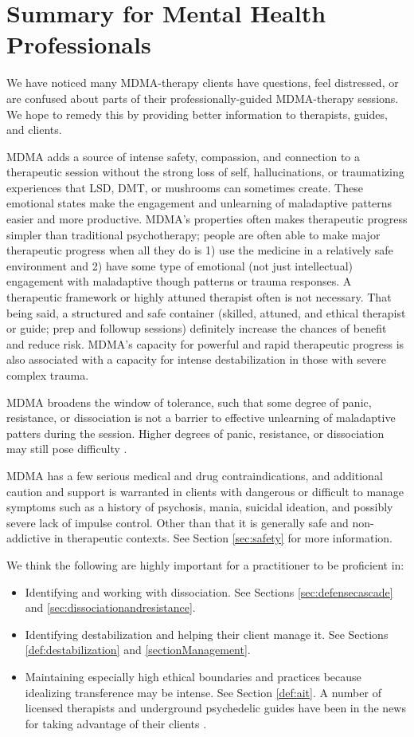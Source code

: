 \documentclass[12pt,letterpaper]{book}
\begin{document}
\section{Summary for Mental Health Professionals}
We have noticed many MDMA-therapy clients have questions, feel distressed, or are confused about parts of their professionally-guided MDMA-therapy sessions. We hope to remedy this by providing better information to therapists, guides, and clients.

MDMA adds a source of intense safety, compassion, and connection to a therapeutic session without the strong loss of self, hallucinations, or traumatizing experiences that LSD, DMT, or mushrooms can sometimes create. These emotional states make the engagement and unlearning of maladaptive patterns easier and more productive. MDMA's properties often makes therapeutic progress simpler than traditional psychotherapy; people are often able to make major therapeutic progress when all they do is 1) use the medicine in a relatively safe environment and 2) have some type of emotional (not just intellectual) engagement with maladaptive though patterns or trauma responses. A therapeutic framework or highly attuned therapist often is not necessary. That being said, a structured and safe container (skilled, attuned, and ethical therapist or guide; prep and followup sessions) definitely increase the chances of benefit and reduce risk. MDMA's capacity for powerful and rapid therapeutic progress is also associated with a capacity for intense destabilization in those with severe complex trauma.

MDMA broadens the window of tolerance, such that some degree of panic, resistance, or dissociation is not a barrier to effective unlearning of maladaptive patters during the session. Higher degrees of panic, resistance, or dissociation may still pose difficulty \cite{razviPresentation}.

MDMA has a few serious medical and drug contraindications, and additional caution and support is warranted in clients with dangerous or difficult to manage symptoms such as a history of psychosis, mania, suicidal ideation, and possibly severe lack of impulse control. Other than that it is generally safe and non-addictive in therapeutic contexts. See Section \ref{sec:safety} for more information.

We think the following are highly important for a practitioner to be proficient in:
\begin{itemize}
    \item Identifying and working with dissociation. See Sections \ref{sec:defensecascade} and \ref{sec:dissociationandresistance}.
    \item Identifying destabilization and helping their client manage it. See Sections \ref{def:destabilization} and \ref{sectionManagement}.
    \item Maintaining especially high ethical boundaries and practices because idealizing transference may be intense. See Section \ref{def:ait}. A number of licensed therapists and underground psychedelic guides have been in the news for taking advantage of their clients \cite{powerTrip}.
\end{itemize}
\end{document}
